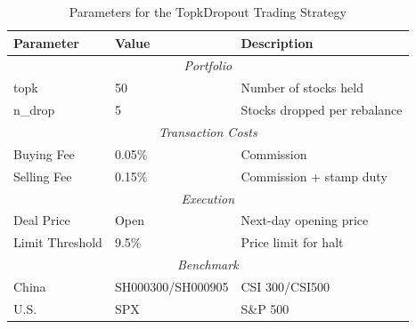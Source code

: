 \begin{table}[!htbp]
\centering
\caption{Parameters for the TopkDropout Trading Strategy}
\label{tab:trading_params}
\begin{tabular}{llp{5cm}}
\toprule
\textbf{Parameter} & \textbf{Value} & \textbf{Description} \\
\midrule
\multicolumn{3}{c}{\textit{Portfolio}} \\
\midrule
topk & 50 & Number of stocks held \\
n\_drop & 5 & Stocks dropped per rebalance \\
\midrule
\multicolumn{3}{c}{\textit{Transaction Costs}} \\
\midrule
Buying Fee & 0.05\% & Commission \\
Selling Fee & 0.15\% & Commission + stamp duty \\
\midrule
\multicolumn{3}{c}{\textit{Execution}} \\
\midrule
Deal Price & Open & Next-day opening price \\
Limit Threshold & 9.5\% & Price limit for halt \\
\midrule
\multicolumn{3}{c}{\textit{Benchmark}} \\
\midrule
China & SH000300/SH000905 & CSI 300/CSI500 \\
U.S. & SPX & S\&P 500 \\
\bottomrule
\end{tabular}
\end{table}